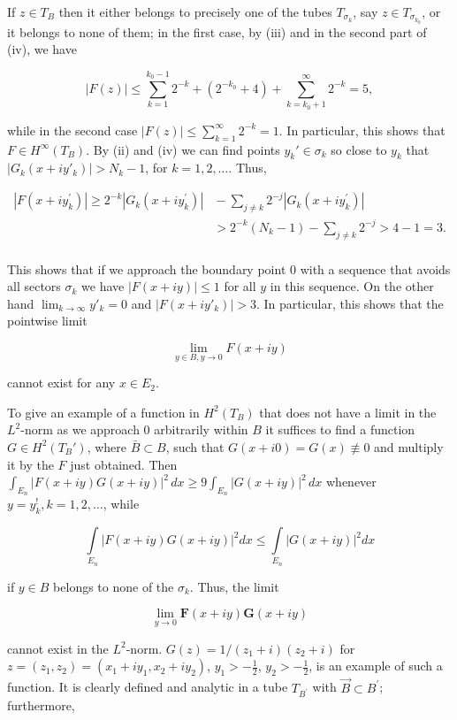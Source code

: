 If $z \in T_B$ then it either belongs to precisely one of the tubes $T_{\sigma_k}$, say $z \in T_{\sigma_{k_0}}$, or it belongs to none of them; in the first case, by (iii) and in the second part of (iv), we have

\[
\left|F(z)\right|\leq\sum_{k=1}^{k_{0}-1}2^{-k}+(2^{-k_{0}}+4)+\sum_{k=k_{0}+1}^{\infty}2^{-k}=5,
\]

while in the second case $|F(z)| \leq \sum_{k=1}^{\infty} 2^{-k} = 1$. In particular, this shows that $F \in H^{\infty}(T_B)$. By (ii) and (iv) we can find points $y_k' \in \sigma_k$ so close to $y_k$ that $|G_k(x + iy'_k)| > N_k - 1$, for $k = 1, 2, \ldots$. Thus,

\[
\begin{aligned}{|F(x+i y_{k}^{\prime})|\geq2^{-k}|G_{k}(x+i y_{k}^{\prime})|}&{{}-\sum_{j\neq k}2^{-j}|G_{k}(x+i y_{k}^{\prime})|}\\ {}&{{}>2^{-k}(N_{k}-1)-\sum_{j\neq k}2^{-j}>4-1=3.}\\ \end{aligned}
\]

This shows that if we approach the boundary point 0 with a sequence that avoids all sectors $\sigma_k$ we have $|F(x + iy)| \leq 1$ for all $y$ in this sequence. On the other hand $\lim_{k \to \infty} y'_k = 0$ and $|F(x + iy'_k)| > 3$. In particular, this shows that the pointwise limit

\[
\lim\limits_{y\in B,y\to0}F(x+iy)
\]

cannot exist for any $x \in E_{2}$.

To give an example of a function in $H^2(T_B)$ that does not have a limit in the $L^2$-norm as we approach 0 arbitrarily within $B$ it suffices to find a function $G\in H^2(T_B')$, where $\bar{B}\subset B$, such that $G(x+i0)=G(x)\not\equiv0$ and multiply it by the $F$ just obtained. Then $\int_{E_n}|F(x+iy)G(x+iy)|^2\,dx\geq9\int_{E_n}|G(x+iy)|^2\,dx$ whenever $y=y_k^!, k=1,2,\ldots$, while

\[
\int\limits_{E_{n}}|F(x+i y)G(x+i y)|^{2}d x\leq\int\limits_{E_{n}}|G(x+i y)|^{2}d x
\]

if $y \in B$ belongs to none of the $\sigma_k$. Thus, the limit

\[
\lim\limits_{y\to0}\boldsymbol{F}(x+iy)\boldsymbol{G}(x+iy)
\]

cannot exist in the $L^{2}$-norm. $G(z) = 1/(z_{1} + i)(z_{2} + i)$ for $z = (z_{1}, z_{2}) = (x_{1} + iy_{1}, x_{2} + iy_{2})$, $y_{1} > -\frac{1}{2}$, $y_{2} > -\frac{1}{2}$, is an example of such a function. It is clearly defined and analytic in a tube $T_{B^{\prime}}$ with $\overrightarrow{B} \subset B^{\prime}$; furthermore,

